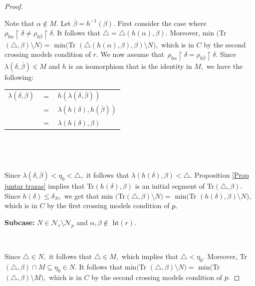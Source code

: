 \documentclass[10pt,a4paper]{amsart}
\begin{document}
\begin{proof}
\qquad\ \ \ \qquad\ \qquad\ \ 

Note that $\alpha\notin M.$ Let $\overline{\beta}=h^{-1}\left(  \beta\right)
.$ First consider the case where $\rho_{0\alpha}\upharpoonright\delta\neq
\rho_{0\overline{\beta}}\upharpoonright\delta.$ It follows that $\triangle
=\triangle(h\left(  \alpha\right)  ,\beta).$ Moreover, \textsf{min}%
$($\textsf{Tr}$(\triangle,\beta)\setminus N)=$ \textsf{min}$($\textsf{Tr}%
$(\triangle\left(  h\left(  \alpha\right)  ,\beta\right)  ,\beta)\setminus
N),$ which is in $C$ by the second crossing models condition of $r.$ We now
assume that\ $\rho_{0\alpha}\upharpoonright\delta=\rho_{0\overline{\beta}%
}\upharpoonright\delta.$ Since $\lambda(\delta,\overline{\beta})\in M$ and $h$
is an isomorphism that is the identity in $M,$ we have the following:\newline

\hfill%
\begin{tabular}
[c]{lll}%
$\lambda(\delta,\overline{\beta})$ & $=$ & $h(\lambda(\delta,\overline{\beta
}))$\\
& $=$ & $\lambda(h\left(  \delta\right)  ,h(\overline{\beta}))$\\
& $=$ & $\lambda(h\left(  \delta\right)  ,\beta)$%
\end{tabular}
\hfill\ 

\qquad\ \qquad\ \qquad\ \qquad\ \ \ \ 

Since $\lambda(\delta,\overline{\beta})<\eta_{0}<\triangle,$ it follows that
$\lambda(h\left(  \delta\right)  ,\beta)<\triangle.$ Proposition
\ref{Prop juntar trazas} implies that \textsf{Tr}$(h\left(  \delta\right)
,\beta)$ is an initial segment of \textsf{Tr}$(\triangle,\beta).$ Since
$h\left(  \delta\right)  \leq\delta_{N},$ we get that \textsf{min}%
$($\textsf{Tr}$(\triangle,\beta)\setminus N)=$ \textsf{min}$($\textsf{Tr}%
$(h\left(  \delta\right)  ,\beta)\setminus N),$ which is in $C$ by the first
crossing models condition of $p.\medskip$

\textbf{Subcase: }$N\in\mathcal{N}_{r}\setminus\mathcal{N}_{p}$ and
$\alpha,\beta\notin$ \textsf{ht}$\left(  r\right)  .$

\qquad\ \qquad\ \ 

Since $\triangle\in N,$ it follows that $\triangle\in M,$ which implies that
$\triangle<\eta_{0}.$ Moreover, \textsf{Tr}$(\triangle,\beta)\cap
M\subseteq\eta_{0}\in N.$ It follows that \textsf{min}$($\textsf{Tr}%
$(\triangle,\beta)\setminus N)=$ \textsf{min}$($\textsf{Tr}$(\triangle
,\beta)\setminus M),$ which is in $C$ by the second crossing models condition
of $p.\medskip$


\end{proof}
\end{document}
